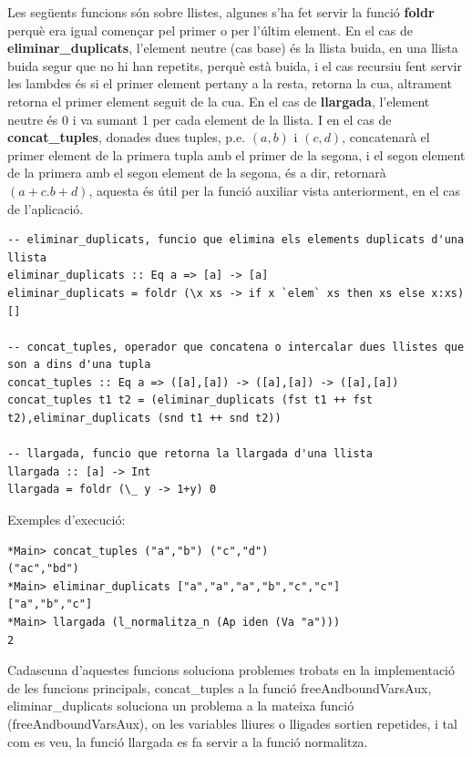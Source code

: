 \documentclass[10pt,a4paper]{article}
\begin{document}
Les següents funcions són sobre llistes, algunes s'ha fet servir la funció \textbf{foldr} perquè era igual començar pel primer o per l'últim element. En el cas de \textbf{eliminar\_duplicats}, l'element neutre (cas base) és la llista buida, en una llista buida segur que no hi han repetits, perquè està buida, i el cas recursiu fent servir les lambdes és si el primer element pertany a la resta, retorna la cua, altrament retorna el primer element seguit de la cua. En el cas de \textbf{llargada}, l'element neutre és 0 i va sumant 1 per cada element de la llista. I en el cas de \textbf{concat\_tuples}, donades dues tuples, p.e. $(a,b)$ i $(c,d)$, concatenarà el primer element de la primera tupla amb el primer de la segona, i el segon element de la primera amb el segon element de la segona, és a dir, retornarà $(a+c.b+d)$, aquesta és útil per la funció auxiliar vista anteriorment, en el cas de l'aplicació.

\lstset{language=Haskell, breaklines=true, basicstyle=\footnotesize}
\begin{lstlisting}[frame=mystyle]
-- eliminar_duplicats, funcio que elimina els elements duplicats d'una llista
eliminar_duplicats :: Eq a => [a] -> [a]
eliminar_duplicats = foldr (\x xs -> if x `elem` xs then xs else x:xs) []

-- concat_tuples, operador que concatena o intercalar dues llistes que son a dins d'una tupla
concat_tuples :: Eq a => ([a],[a]) -> ([a],[a]) -> ([a],[a])
concat_tuples t1 t2 = (eliminar_duplicats (fst t1 ++ fst t2),eliminar_duplicats (snd t1 ++ snd t2))

-- llargada, funcio que retorna la llargada d'una llista
llargada :: [a] -> Int
llargada = foldr (\_ y -> 1+y) 0
\end{lstlisting}

Exemples d'execució:

\lstset{language=Haskell, breaklines=true, basicstyle=\footnotesize}
\begin{lstlisting}[frame=mystyle]
*Main> concat_tuples ("a","b") ("c","d")
("ac","bd")
*Main> eliminar_duplicats ["a","a","a","b","c","c"]
["a","b","c"]
*Main> llargada (l_normalitza_n (Ap iden (Va "a")))
2
\end{lstlisting}

Cadascuna d'aquestes funcions soluciona problemes trobats en la implementació de les funcions principals, concat\_tuples a la funció freeAndboundVarsAux, eliminar\_duplicats soluciona un problema a la mateixa funció (freeAndboundVarsAux), on les variables lliures o lligades sortien repetides, i tal com es veu, la funció llargada es fa servir a la funció normalitza.
\end{document}
